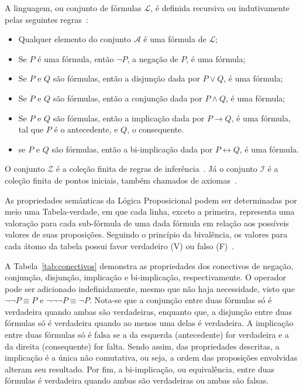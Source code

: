 A linguagem, ou conjunto de fórmulas $\mathcal{L}$, é definida recursiva ou indutivamente pelas seguintes regras~\cite{bedregal2002logica, abe2002introduccao}:
\begin{itemize}
	\item Qualquer elemento do conjunto $\mathcal{A}$ é uma fórmula de $\mathcal{L}$;
	\item Se $P$ é uma fórmula, então $\neg P$, a negação de $P$, é uma fórmula;
	\item Se $P$ e $Q$ são fórmulas, então a disjunção dada por $P \vee Q$, é uma fórmula;
	\item Se $P$ e $Q$ são fórmulas, então a conjunção dada por $P \wedge Q$, é uma fórmula;
	\item Se $P$ e $Q$ são fórmulas, então a implicação dada por $P \rightarrow Q$, é uma fórmula, tal que $P$ é o antecedente, e $Q$, o consequente.
	\item se $P$ e $Q$ são fórmulas, então a bi-implicação dada por $P \leftrightarrow Q$, é uma fórmula.     
\end{itemize}

O conjunto $\mathcal{Z}$ é a coleção finita de regras de inferência~\cite{bedregal2002logica}. Já o conjunto $\mathcal{I}$ é a coleção finita de pontos iniciais, também chamados de axiomas~\cite{bedregal2002logica}.

As propriedades semânticas da Lógica Proposicional podem ser determinadas por meio uma Tabela-verdade, em que cada linha, exceto a primeira, representa uma valoração para cada sub-fórmula de uma dada fórmula em relação aos possíveis valores de suas proposições. Seguindo o princípio da bivalência, os valores para cada átomo da tabela possui favor verdadeiro (V) ou falso (F)~\cite{bedregal2002logica}.

A Tabela~\ref{tab:conectivos} demonstra as propriedades dos conectivos de negação, conjunção, disjunção, implicação e bi-implicação, respectivamente. O operador pode ser adicionado indefinidamente, mesmo que não haja necessidade, visto que $\neg \neg P \equiv P$ e $\neg \neg \neg P \equiv \neg P$. Nota-se que a conjunção entre duas fórmulas só é verdadeira quando ambas são verdadeiras, enquanto que, a disjunção entre duas fórmulas só é verdadeira quando ao menos uma delas é verdadeira. A implicação entre duas fórmulas só é falsa se a da esquerda (antecedente) for verdadeira e a da direita (consequente) for falta. Sendo assim, das propriedades descritas, a implicação é a única não comutativa, ou seja, a ordem das proposições envolvidas alteram seu resultado. Por fim, a bi-implicação, ou equivalência, entre duas fórmulas é verdadeira quando ambas são verdadeiras ou ambas são falsas.

